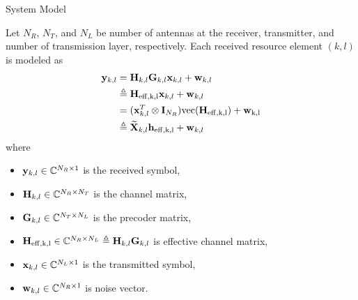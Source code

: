 \documentclass[xcolor=dvipsnames,12pt]{beamer}
\newcommand{\myfootercenter}{ITRI Communication Protocol Development Engineer (M201)}
\newcommand{\setfooter}[1]{\renewcommand{\myfootercenter}{#1}}
\begin{document}
\setfooter{System Model}
\begin{frame}{System Model}
\begin{footnotesize}
    Let $N_R$, $N_T$, and $N_L$ be number of antennas at the receiver, transmitter, and number of transmission layer, respectively.  Each received resource element $(k,l)$ is modeled as
    \begin{equation}
        \begin{aligned}
            \mathbf{y}_{k,l} 
            &= \mathbf{H}_{k,l} \mathbf{G}_{k,l} \mathbf{x}_{k,l} + \mathbf{w}_{k,l} \\
            &\triangleq \mathbf{H}_{\rm{eff},k,l} \mathbf{x}_{k,l} + \mathbf{w}_{k,l} \\
            &= (\mathbf{x}_{k,l}^T \otimes {\bf I}_{N_R}) \rm{vec}(\mathbf{H}_{\rm{eff},k,l}) + \mathbf{w}_{k,l} \\
            &\triangleq {\widetilde{{\bf X}}}_{k,l} \mathbf{h}_{\rm{eff},k,l} + \mathbf{w}_{k,l}
        \end{aligned}
        \label{eq:system_model}
    \end{equation}
    where 
    \begin{itemize}
        \footnotesize
        \item $\mathbf{y}_{k,l} \in \mathbb{C}^{N_R \times 1}$ is the received symbol,
        \item $\mathbf{H}_{k,l} \in \mathbb{C}^{N_R \times N_T}$ is the channel matrix,
        \item $\mathbf{G}_{k,l} \in \mathbb{C}^{N_T \times N_L}$ is the precoder matrix,
        \item $\mathbf{H}_{\rm{eff},k,l} \in \mathbb{C}^{N_R \times N_L} \triangleq \mathbf{H}_{k,l} \mathbf{G}_{k,l}$ is effective channel matrix,
        \item $\mathbf{x}_{k,l} \in \mathbb{C}^{N_L \times 1}$ is the transmitted symbol,
        \item $\mathbf{w}_{k,l} \in \mathbb{C}^{N_R \times 1}$ is noise vector.
    \end{itemize}

\end{footnotesize}
\end{frame}
\end{document}
